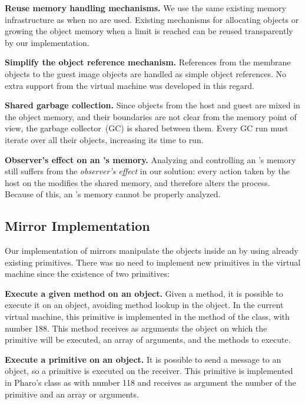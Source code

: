 \begin{description}
	\item \textbf{Reuse memory handling mechanisms.} We use the same existing memory infrastructure as when no \objectspaces are used. Existing mechanisms for allocating objects or growing the object memory when a limit is reached can be reused transparently by our implementation. 
	\item \textbf{Simplify the object reference mechanism.} References from the membrane objects to the guest image objects are handled as simple object references. No extra support from the virtual machine was developed in this regard.
	\item \textbf{Shared garbage collection.} Since objects from the host and guest are mixed in the object memory, and their boundaries are not clear from the memory point of view, the garbage collector~(GC) is shared between them. Every GC run must iterate over all their objects, increasing its time to run.
	
	\item \textbf{Observer's effect on an \objectspace's memory.} Analyzing and controlling an \objectspace's memory still suffers from the \emph{observer's effect} in our solution: every action taken by the host on the \objectspace modifies the shared memory, and therefore alters the process. Because of this, an \objectspace's memory cannot be properly analyzed.
\end{description}

\subsection{Mirror Implementation}

Our implementation of mirrors manipulate the objects inside an \objectspace by using already existing primitives. There was no need to implement new primitives in the virtual machine since the existence of two primitives:
\begin{description}
	\item \textbf{Execute a given method on an object.} Given a method, it is possible to execute it on an object, avoiding method lookup in the object. In the current virtual machine, this primitive is implemented in the method \textbf{} of the  class, with number 188. This method receives as arguments the object on which the primitive will be executed, an array of arguments, and the methods to execute.
	\item \textbf{Execute a primitive on an object.} It is possible to send a message to an object, so a primitive is executed on the receiver. This primitive is implemented in Pharo's  class as \textbf{} with number 118 and receives as argument the number of the primitive and an array or arguments.
\end{description}


